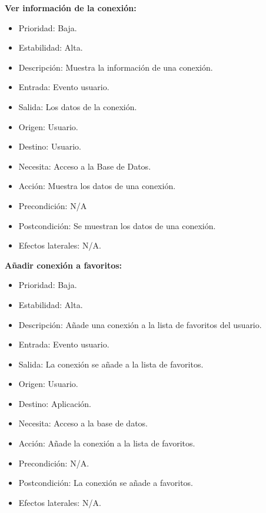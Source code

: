 \textbf{Ver información de la conexión:}
\begin{itemize}
\item Prioridad: Baja.
\item Estabilidad: Alta.
\item Descripción: Muestra la información de una conexión.
\item Entrada: Evento usuario.
\item Salida: Los datos de la conexión.
\item Origen: Usuario.
\item Destino: Usuario.
\item Necesita: Acceso a la Base de Datos.
\item Acción: Muestra los datos de una conexión.
\item Precondición: N/A
\item Postcondición: Se muestran los datos de una conexión.
\item Efectos laterales: N/A.\\

\end{itemize}
\newpage
\textbf{Añadir conexión a favoritos:}
\begin{itemize}
\item Prioridad: Baja.
\item Estabilidad: Alta.
\item Descripción: Añade una conexión a la lista de favoritos del usuario.
\item Entrada: Evento usuario.
\item Salida: La conexión se añade a la lista de favoritos.
\item Origen: Usuario.
\item Destino: Aplicación.
\item Necesita: Acceso a la base de datos.
\item Acción: Añade la conexión a la lista de favoritos.
\item Precondición: N/A.
\item Postcondición: La conexión se añade a favoritos.
\item Efectos laterales: N/A.\\

\end{itemize}

